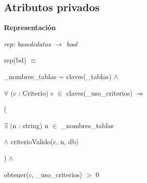 \subsection*{Atributos privados}
\begin{Indent}{\bf Representación}\par
{\em rep\-: basededatos $\to$ bool\par
rep(bd) $\equiv$
\begin{DoxyItemize}
\item \-\_\-nombres\-\_\-tablas = claves(\-\_\-tablas) $\land$
\item $\forall$ (c \-: Criterio) c $\in$ claves(\-\_\-uso\-\_\-criterios) $\Rightarrow$
\begin{DoxyItemize}
\item (
\begin{DoxyItemize}
\item $\exists$ (n \-: string) n $\in$ \-\_\-nombres\-\_\-tablas
\item $\land$ criterio\-Valido(c, n, db)
\end{DoxyItemize}
\item ) $\land$
\item obtener(c, \-\_\-uso\-\_\-criterios) $>$ 0
\end{DoxyItemize}
\end{DoxyItemize}

}
\end{Indent}
